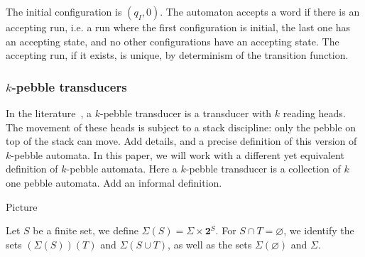 
The initial configuration is $(q_I, 0)$. The automaton accepts a word if there is an accepting run,
i.e. a run where the first configuration is initial, the last one has an accepting
state, and no other configurations have an accepting state. The accepting run, if it exists, is unique, by determinism of the transition function.


\subsubsection{$k$-pebble transducers}

In the literature~\cite{}, a $k$-pebble transducer is a transducer with $k$ reading heads. The movement of these heads is subject to a stack discipline: only the pebble on top of the stack can move. Add details, and a precise definition of this version of $k$-pebble automata. 
In this paper, we will work with a different yet equivalent definition of $k$-pebble automata. Here a $k$-pebble transducer is a collection of $k$ one pebble automata. Add an informal definition.
\begin{center}
Picture
\end{center}
Let $S$ be a finite set, we define $\Sigma(S)=\Sigma\times \mathbf 2^S$. For $S\cap T=\varnothing$, we identify the sets $(\Sigma(S))(T)$ and $\Sigma(S\cup T)$, as well as the sets $\Sigma(\varnothing)$ and $\Sigma$.

\begin{comment}
\begin{definition}%
A $k$-pebble transducer of input alphabet $\Sigma$ and output alphabet $\Gamma$ is a tuple $\Tt=(T_k,\dots,T_{1})$ such that for every $i\leq n$:
\begin{itemize}
\item  $T_i$ is 1-pebble transducer, whose set of states is $Q_i$;
\item  The input alphabet of $T_i$ is $\Sigma_{[i+1,k]}$;
\item  The output alphabet of $T_i$ is $\Gamma\cup\bigcup_{1\leq j <i } Q_j$.
\end{itemize} 
In particular, the input alphabet of $T_k$ is $\Sigma$ and the output alphabet of $T_1$ is $\Gamma$. We denote by $\Tt_i$ the transducer $T_i$. 
\end{definition}
\end{comment}

